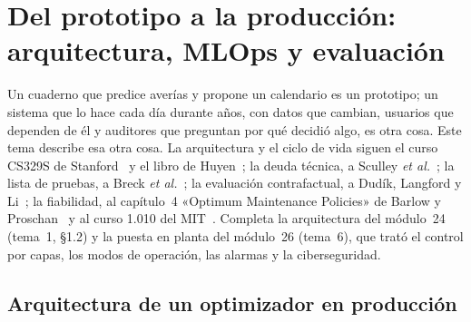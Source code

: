 \chapter{Del prototipo a la producción: arquitectura, MLOps y evaluación}
\label{tema:4}

Un cuaderno que predice averías y propone un calendario es un prototipo; un sistema que lo hace cada día durante años, con datos que cambian, usuarios que dependen de él y auditores que preguntan por qué decidió algo, es otra cosa. Este tema describe esa otra cosa. La arquitectura y el ciclo de vida siguen el curso CS329S de Stanford~\cite{cs329s} y el libro de Huyen~\cite{huyen}; la deuda técnica, a Sculley \emph{et al.}~\cite{sculley}; la lista de pruebas, a Breck \emph{et al.}~\cite{breck}; la evaluación contrafactual, a Dudík, Langford y Li~\cite{dudik}; la fiabilidad, al capítulo~4 «Optimum Maintenance Policies» de Barlow y Proschan~\cite{bp} y al curso 1.010 del MIT~\cite{mit1010}. Completa la arquitectura del módulo~24 (tema~1, §1.2) y la puesta en planta del módulo~26 (tema~6), que trató el control por capas, los modos de operación, las alarmas y la ciberseguridad.

\section{Arquitectura de un optimizador en producción}

